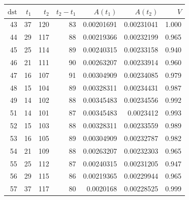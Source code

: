 \begin{tabular}{r r r r r r r}
\toprule
$\mathrm{dst}$ & $t_1$ & $t_2$ & $t_2-t_1$ & $A(t_1)$ & $A(t_2)$ & $V$ \\
\midrule
43 & 37 & 120 & 83 & 0.00201691 & 0.00231041 & 1.000 \\
44 & 29 & 117 & 88 & 0.00219366 & 0.00232199 & 0.965 \\
45 & 25 & 114 & 89 & 0.00240315 & 0.00233158 & 0.940 \\
46 & 21 & 111 & 90 & 0.00263207 & 0.00233914 & 0.960 \\
47 & 16 & 107 & 91 & 0.00304909 & 0.00234085 & 0.979 \\
48 & 15 & 104 & 89 & 0.00328311 & 0.00234431 & 0.987 \\
49 & 14 & 102 & 88 & 0.00345483 & 0.00234556 & 0.992 \\
51 & 14 & 101 & 87 & 0.00345483 & 0.0023412 & 0.993 \\
52 & 15 & 103 & 88 & 0.00328311 & 0.00233559 & 0.989 \\
53 & 16 & 105 & 89 & 0.00304909 & 0.00232787 & 0.982 \\
54 & 21 & 109 & 88 & 0.00263207 & 0.00232303 & 0.965 \\
55 & 25 & 112 & 87 & 0.00240315 & 0.00231205 & 0.947 \\
56 & 29 & 115 & 86 & 0.00219365 & 0.00229944 & 0.965 \\
57 & 37 & 117 & 80 & 0.0020168 & 0.00228525 & 0.999 \\
\bottomrule
\end{tabular}
